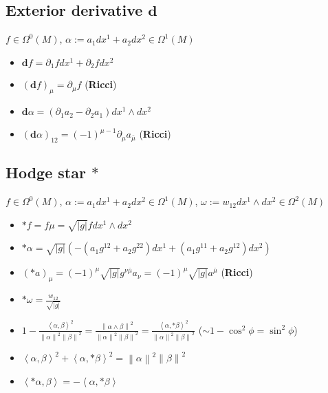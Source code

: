 \documentclass{scrartcl}
\newcommand{\exd}{\mathbf{d}}
\begin{document}
    \subsection{Exterior derivative \( \exd \)}
      \( f\in \Omega^{0}(M)\), 
      \( \alpha:= a_{1}dx^{1} + a_{2}dx^{2} \in \Omega^{1}(M) \)
      \begin{itemize}
        \item \( \exd f = \partial_{1}fdx^{1} + \partial_{2}fdx^{2} \)
        \item \( \left( \exd f \right)_{\mu} = \partial_{\mu}f \)  (\textbf{Ricci})
        \item \( \exd\alpha = \left( \partial_{1}a_{2} - \partial_{2}a_{1} \right) dx^{1}\wedge dx^{2}\)
        \item \( (\exd\alpha)_{12} = (-1)^{\mu-1}\partial_{\mu}a_{\bar{\mu}} \) (\textbf{Ricci})
      \end{itemize}

    \subsection{Hodge star \( * \)}
      \( f\in \Omega^{0}(M)\),
      \( \alpha:= a_{1}dx^{1} + a_{2}dx^{2} \in \Omega^{1}(M) \),
      \( \omega:= w_{12}dx^{1}\wedge dx^{2} \in \Omega^{2}(M) \)
      \begin{itemize}
        \item \( *f = f\mu = \sqrt{|g|}f dx^{1}\wedge dx^{2}\)
        \item \( *\alpha = \sqrt{|g|}\left( -\left( a_{1}g^{12} + a_{2}g^{22} \right)dx^{1} 
                                            +\left( a_{1}g^{11} + a_{2}g^{12} \right)dx^{2}\right) \)
        \item \( (*a)_{\mu} =  \left( -1 \right)^{\mu} \sqrt{|g|} g^{\nu\bar{\mu}}a_{\nu}
                          = \left( -1 \right)^{\mu} \sqrt{|g|} a^{\bar{\mu}}\)
                          (\textbf{Ricci})
        \item \( *\omega = \frac{w_{12}}{\sqrt{|g|}} \)
        \item \( 1-\frac{\left\langle \alpha,\beta \right\rangle^{2}}{\left\| \alpha \right\|^{2}\left\| \beta \right\|^{2}} 
                  = \frac{\left\| \alpha\wedge\beta \right\|^{2}}{\left\| \alpha \right\|^{2}\left\| \beta \right\|^{2}}
                  = \frac{\left\langle \alpha, *\beta \right\rangle^{2}}{\left\| \alpha \right\|^{2}\left\| \beta \right\|^{2}}\)
              (\( \sim 1-\cos^{2}\phi = \sin^{2}\phi\))
        \item \( \left\langle \alpha , \beta \right\rangle^{2} + \left\langle \alpha, *\beta \right\rangle^{2}
                    = \left\| \alpha \right\|^{2}\left\| \beta \right\|^{2}\)
        \item \( \left\langle *\alpha , \beta \right\rangle = -\left\langle \alpha , *\beta \right\rangle  \)
      \end{itemize}
\end{document}
